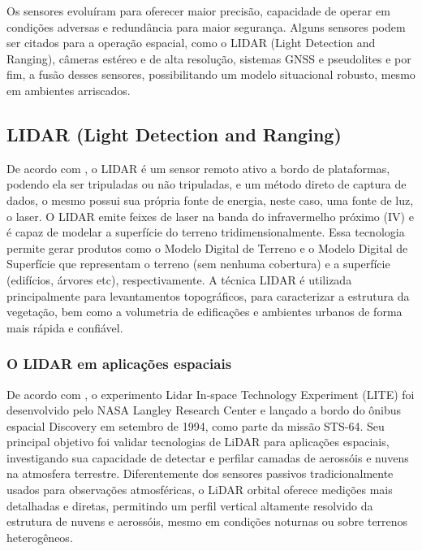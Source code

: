 Os sensores evoluíram para oferecer maior precisão, capacidade de operar em condições adversas e redundância para maior segurança. Alguns sensores podem ser citados para a operação espacial, como o LIDAR (Light Detection and Ranging), câmeras estéreo e de alta resolução, sistemas GNSS e pseudolites e por fim, a fusão desses sensores, possibilitando um modelo situacional robusto, mesmo em ambientes arriscados.

\subsection{LIDAR (Light Detection and Ranging)}

De acordo com \citep{inpeLidar}, o LIDAR é um sensor remoto ativo a bordo de plataformas, podendo ela ser tripuladas ou não tripuladas, e um método direto de captura de dados, o mesmo possui sua própria fonte de energia, neste caso, uma fonte de luz, o laser. O LIDAR emite feixes de laser na banda do infravermelho próximo (IV) e é capaz de modelar a superfície do terreno tridimensionalmente. Essa tecnologia permite gerar produtos como o Modelo Digital de Terreno e o Modelo Digital de Superfície que representam o terreno (sem nenhuma cobertura) e a superfície (edifícios, árvores etc), respectivamente. A técnica LIDAR é utilizada principalmente para levantamentos topográficos, para caracterizar a estrutura da vegetação, bem como a volumetria de edificações e ambientes urbanos de forma mais rápida e confiável.

\subsubsection{O LIDAR em aplicações espaciais}

De acordo com \citep{winker1996}, o experimento Lidar In-space Technology Experiment (LITE) foi desenvolvido pelo NASA Langley Research Center e lançado a bordo do ônibus espacial Discovery em setembro de 1994, como parte da missão STS-64. Seu principal objetivo foi validar tecnologias de LiDAR para aplicações espaciais, investigando sua capacidade de detectar e perfilar camadas de aerossóis e nuvens na atmosfera terrestre. Diferentemente dos sensores passivos tradicionalmente usados para observações atmosféricas, o LiDAR orbital oferece medições mais detalhadas e diretas, permitindo um perfil vertical altamente resolvido da estrutura de nuvens e aerossóis, mesmo em condições noturnas ou sobre terrenos heterogêneos.

